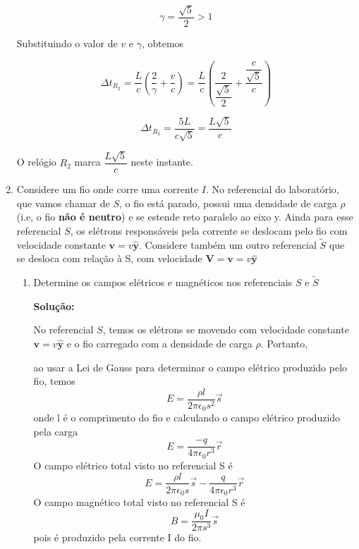 \documentclass[10pt,a4paper]{article}
\begin{document}
\begin{enumerate}
	\begin{equation*}
		\gamma = \dfrac{\sqrt{5}}{2} > 1
	\end{equation*}
	
	Substituindo o valor de $ v $ e $ \gamma $, obtemos
	
	\begin{equation*}
		\Delta t_{R_2}  = \dfrac{L}{c} (\dfrac{2}{\gamma} + \dfrac{v}{c}) = \dfrac{L}{c} (\dfrac{2}{ \dfrac{\sqrt{5}}{2}} + \dfrac{\dfrac{c}{\sqrt{5}}}{c})
	\end{equation*}

	\begin{equation*}
		\Delta t_{R_2}  = \dfrac{5L}{c\sqrt{5}} = \dfrac{L\sqrt{5}}{c}
	\end{equation*}

	O relógio $ R_2 $ marca $\dfrac{L\sqrt{5}}{c}  $ neste instante.
	
	\item Considere um fio onde corre uma corrente $I$. No referencial do laboratório, que vamos chamar de $S$, o fio está parado, possui uma densidade de carga $\rho$ (i.e, o fio \textbf{não é neutro}) e se estende reto paralelo ao eixo y. Ainda para esse referencial $S$, os elétrons responsáveis pela corrente se deslocam pelo fio com velocidade constante $\mathbf{v} =v \mathbf{\hat{y}}$. Considere também um outro referencial $\tilde{S}$ que se desloca com relação à S, com velocidade $\mathbf{V} = \mathbf{v} = v\mathbf{\hat{y}}$
	\begin{enumerate}
		\item Determine os campos elétricos e magnéticos nos referenciais $S$ e $\tilde{S}$
		
		\textbf{Solução: }
		
		No referencial $ S $, temos os elétrons se movendo com velocidade constante $\mathbf{v} =v \mathbf{\hat{y}}$ e o fio carregado com a densidade de carga $\rho$. Portanto,
		
		ao usar a Lei de Gauss para determinar o campo elétrico produzido pelo fio, temos
		\begin{equation*}
			E = \dfrac{\rho l}{2\pi \epsilon_0s^2 }\vec{s}
		\end{equation*}
		onde l é o comprimento do fio e calculando o campo elétrico produzido pela carga
		\begin{equation*}
			E = \dfrac{-q}{4\pi \epsilon_0 r^3}\vec{r}
		\end{equation*}
		O campo elétrico total visto no referencial S é
		\begin{equation*}
			E = \dfrac{\rho l}{2\pi \epsilon_0s }\vec{s}-\dfrac{q}{4\pi \epsilon_0 r^3}\vec{r}
		\end{equation*}
		O campo magnético total visto no referencial S é
		\begin{equation*}
			B = \dfrac{\mu_0 I}{2\pi s^3}\vec{s} 
		\end{equation*}
		pois é produzido pela corrente I do fio.
		

\end{enumerate}
\end{enumerate}
\end{document}
